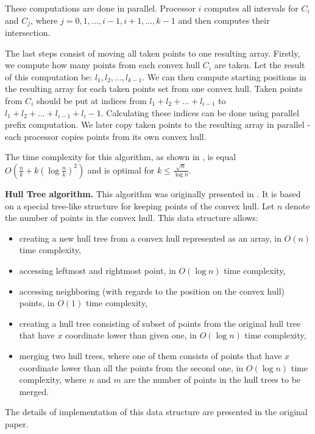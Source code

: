 \documentclass[letterpaper]{article}
\newcommand{\mypar}[1]{{\bf #1.}}
\theoremstyle{definition}
\begin{document}
These computations are done in parallel.
Processor $i$ computes all intervals for $C_i$ and $C_j$, where $j = 0, 1, ..., i -1, i+ 1, ..., k - 1$ and then computes their intersection.

The last steps consist of moving all taken points to one resulting array.
Firstly, we compute how many points from each convex hull $C_i$ are taken.
Let the result of this computation be: $l_1, l_2, ..., l_{k-1}$.
We can then compute starting positions in the resulting array for each taken points set from one convex hull.
Taken points from $C_i$ should be put at indices from $l_1 + l_2 + ... + l_{i-1}$ to $l_1 + l_2 + ... + l_{i-1} + l_i - 1$.
Calculating these indices can be done using parallel prefix computation.
We later copy taken points to the resulting array in parallel - each processor copies points from its own convex hull.


The time complexity for this algorithm, as shown in \cite{SimpleParallel}, is equal $O(\frac{n}{k} + k(\log \frac{n}{k})^2)$ and is optimal for $k \leq \frac{\sqrt{n}}{\log n}$.

\mypar{Hull Tree algorithm}
This algorithm was originally presented in \cite{HullTree}.
It is based on a special tree-like structure for keeping points of the convex hull.
Let $n$ denote the number of points in the convex hull.
This data structure allows:
\begin{itemize}
\item creating a new hull tree from a convex hull represented as an array, in $O(n)$ time complexity,
\item accessing leftmost and rightmost point, in $O(\log n)$ time complexity,
\item accessing neighboring (with regards to the position on the convex hull) points, in $O(1)$ time complexity,
\item creating a hull tree consisting of subset of points from the original hull tree that have $x$ coordinate lower than given one, in $O(\log n)$ time complexity,
\item merging two hull trees, where one of them consists of points that have $x$ coordinate lower than all the points from the second one, in $O(\log n)$ time complexity, where $n$ and $m$ are the number of points in the hull trees to be merged.
\end{itemize}
The details of implementation of this data structure are presented in the original paper.
\end{document}
